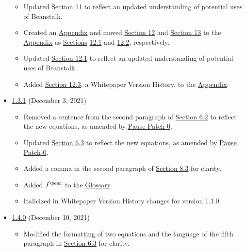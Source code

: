 \documentclass[class=article, crop=false]{standalone}
\begin{document}
\begin{itemize}[topsep=0pt, itemsep=3pt,leftmargin=16pt]
\begin{itemize}
        \item Updated \hyperlink{section.11}{Section 11} to reflect an updated understanding of potential uses of Beanstalk. 
        \item Created an \hyperlink{section.14}{Appendix} and moved \hyperlink{subsection.12.1}{Section 12} and \hyperlink{subsection.12.2}{Section 13} to the \hyperlink{section.14}{Appendix} as \hyperlink{section.12}{Sections} \hyperlink{subsection.12.1}{12.1} and \hyperlink{subsection.12.2}{12.2}, respectively. 
        \item Updated \hyperlink{subsection.12.1}{Section 12.1} to reflect an updated understanding of potential uses of Beanstalk. 
        \item Added \hyperlink{subsection.12.3}{Section 12.3}, a Whitepaper Version History, to the \hyperlink{section.14}{Appendix}.
    \newpage
    \end{itemize}
    \item \href{https://github.com/BeanstalkFarms/Beanstalk/blob/master/version-history/beanstalk1_3_1.pdf}{1.3.1} (December 3, 2021)
    \begin{itemize}
        \item Removed a sentence from the second paragraph of \hyperlink{subsection.6.2}{Section 6.2} to reflect the new  equations, as amended by \href{https://snapshot.org/\#/beanstalkfarms.eth/proposal/0xffc6033eb5a4e53f4da5df1c4011bacc12244914885fe11e6a6f2d09d856feed}{Pause Patch-0}.
        \item Updated \hyperlink{subsection.6.3}{Section 6.3} to reflect the new  equations, as amended by \href{https://snapshot.org/\#/beanstalkfarms.eth/proposal/0xffc6033eb5a4e53f4da5df1c4011bacc12244914885fe11e6a6f2d09d856feed}{Pause Patch-0}.
        \item Added a comma in the second paragraph of \hyperlink{subsection.8.3}{Section 8.3} for clarity.
        \item Added $f^{\bean}$ to the \hyperlink{subsection.14.11}{Glossary}. 
        \item Italicized  in Whitepaper Version History changes for version 1.1.0.
    \end{itemize}
    \item \href{https://github.com/BeanstalkFarms/Beanstalk/blob/master/version-history/beanstalk1_4_0.pdf}{1.4.0} (December 10, 2021)
    \begin{itemize}
        \item Modified the formatting of two equations and the language of the fifth paragraph in \hyperlink{subsection.6.3}{Section 6.3} for clarity.

\end{itemize}
\end{itemize}
\end{document}
